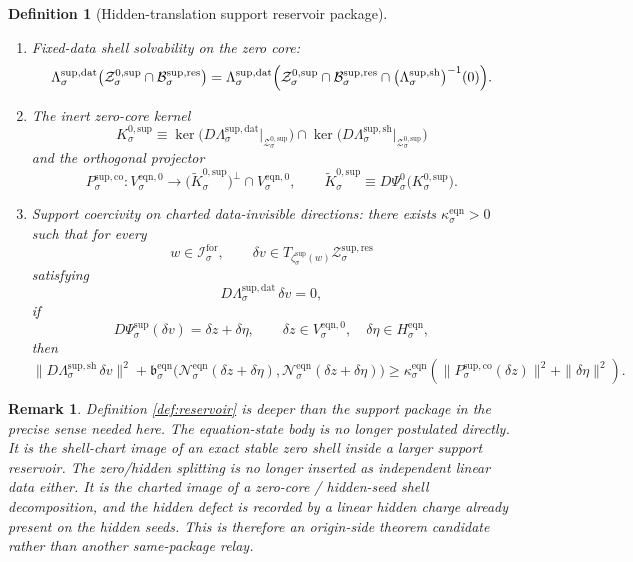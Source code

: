 \documentclass[11pt]{article}
\newcommand{\ForSpace}[1]{\mathcal I_{#1}^{\mathrm{for}}}
\newcommand{\Reduction}[1]{\mathcal R_{#1}}
\newcommand{\CurrentCarrier}[1]{\mathfrak C_{#1}^{\mathrm{cur}}}
\newcommand{\EqCarrier}[1]{\mathfrak C_{#1}^{\mathrm{eq}}}
\newcommand{\EqnPair}[1]{\mathfrak b_{#1}^{\mathrm{eqn}}}
\newcommand{\EqnZero}[1]{V_{#1}^{\mathrm{eqn},0}}
\newcommand{\EqnHidden}[1]{H_{#1}^{\mathrm{eqn}}}
\newcommand{\EqnLin}[1]{\mathcal N_{#1}^{\mathrm{eqn}}}
\newcommand{\ResBody}[1]{\mathcal B_{#1}^{\mathrm{sup,res}}}
\newcommand{\ResShellSet}[1]{\mathcal Z_{#1}^{\mathrm{sup,res}}}
\newcommand{\ResData}[1]{\Lambda_{#1}^{\mathrm{sup,dat}}}
\newcommand{\ResShellMap}[1]{\Lambda_{#1}^{\mathrm{sup,sh}}}
\newcommand{\ResZeroCore}[1]{\mathcal Z_{#1}^{0,\mathrm{sup}}}
\newcommand{\ShellChart}[1]{\Psi_{#1}^{\mathrm{sup}}}
\newcommand{\ZeroChart}[1]{\Psi_{#1}^{0}}
\newcommand{\ResEmbed}[1]{\zeta_{#1}^{\mathrm{sup}}}
\newcommand{\ResKernel}[1]{K_{#1}^{0,\mathrm{sup}}}
\newcommand{\ResKernelCh}[1]{\widetilde K_{#1}^{0,\mathrm{sup}}}
\newcommand{\ResStateComp}[1]{P_{#1}^{\mathrm{sup,co}}}
\newtheorem{definition}{Definition}
\newtheorem{remark}{Remark}
\begin{document}
\begin{definition}[Hidden-translation support reservoir package]
\begin{enumerate}
\begin{equation}
    =
    \bigl(
    \jmath_{\sigma}(\Reduction{\sigma}(w)),
    \CurrentCarrier{\sigma}(w),
    \EqCarrier{\sigma}(w)
    \bigr)
    \label{eq:reservoircompat}
    \end{equation}
    for every \(w\in\ForSpace{\sigma}\).
    \item Fixed-data shell solvability on the zero core:
    \begin{equation}
    \ResData{\sigma}\bigl(
    \ResZeroCore{\sigma}\cap\ResBody{\sigma}
    \bigr)
    =
    \ResData{\sigma}\Bigl(
    \ResZeroCore{\sigma}\cap
    \ResBody{\sigma}\cap
    \bigl(\ResShellMap{\sigma}\bigr)^{-1}(0)
    \Bigr).
    \label{eq:reservoirsolvability}
    \end{equation}
    \item The inert zero-core kernel
    \[
    \ResKernel{\sigma}
    \equiv
    \ker\bigl(D\ResData{\sigma}\big|_{\ResZeroCore{\sigma}}\bigr)
    \cap
    \ker\bigl(D\ResShellMap{\sigma}\big|_{\ResZeroCore{\sigma}}\bigr)
    \]
    and the orthogonal projector
    \[
    \ResStateComp{\sigma}:
    \EqnZero{\sigma}\to
    \bigl(\ResKernelCh{\sigma}\bigr)^{\perp}\cap\EqnZero{\sigma},
    \qquad
    \ResKernelCh{\sigma}
    \equiv
    D\ZeroChart{\sigma}\bigl(\ResKernel{\sigma}\bigr).
    \]
    \item Support coercivity on charted data-invisible directions: there exists \(\kappa_{\sigma}^{\mathrm{eqn}}>0\) such that for every
    \[
    w\in\ForSpace{\sigma},
    \qquad
    \delta v\in T_{\ResEmbed{\sigma}(w)}\ResShellSet{\sigma}
    \]
    satisfying
    \[
    D\ResData{\sigma}\,\delta v=0,
    \]
    if
    \[
    D\ShellChart{\sigma}(\delta v)=\delta z+\delta\eta,
    \qquad
    \delta z\in\EqnZero{\sigma},
    \quad
    \delta\eta\in\EqnHidden{\sigma},
    \]
    then
    \begin{equation}
    \|D\ResShellMap{\sigma}\,\delta v\|^{2}
    +
    \EqnPair{\sigma}\bigl(
    \EqnLin{\sigma}(\delta z+\delta\eta),
    \EqnLin{\sigma}(\delta z+\delta\eta)
    \bigr)
    \ge
    \kappa_{\sigma}^{\mathrm{eqn}}
    \left(
    \|\ResStateComp{\sigma}(\delta z)\|^{2}
    +
    \|\delta\eta\|^{2}
    \right).
    \label{eq:reservoircoercive}
    \end{equation}
\end{enumerate}
\end{definition}

\begin{remark}
Definition \ref{def:reservoir} is deeper than the support package in the precise sense needed here. The equation-state body is no longer postulated directly. It is the shell-chart image of an exact stable zero shell inside a larger support reservoir. The zero/hidden splitting is no longer inserted as independent linear data either. It is the charted image of a zero-core / hidden-seed shell decomposition, and the hidden defect is recorded by a linear hidden charge already present on the hidden seeds. This is therefore an origin-side theorem candidate rather than another same-package relay.
\end{remark}
\end{document}
